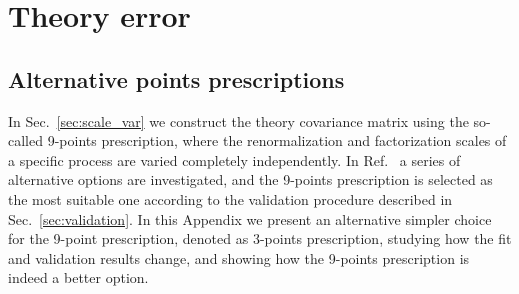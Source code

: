 \chapter{Theory error}
\section{Alternative points prescriptions}
In Sec.~\ref{sec:scale_var} we construct the theory covariance matrix using the so-called 9-points prescription, 
where the renormalization and factorization scales of a specific process are varied completely independently.
In Ref.~\cite{AbdulKhalek:2019ihb} a series of alternative options are investigated, and the 9-points prescription is selected 
as the most suitable one according to the validation procedure described in Sec.~\ref{sec:validation}.
In this Appendix we present an alternative simpler choice for the 9-point prescription, denoted as 3-points prescription,
studying how the fit and validation results change, and showing how the 9-points prescription is indeed a better option. 

